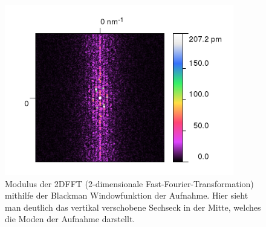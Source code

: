 \begin{figure}  
    \includegraphics[width=10cm]{pics/fourier3}
  \caption{Modulus der 2DFFT (2-dimensionale Fast-Fourier-Transformation) 
      mithilfe der Blackman Windowfunktion
  der Aufnahme. Hier sieht man deutlich das vertikal verschobene Sechseck in der Mitte,
  welches die Moden der Aufnahme darstellt.}
\label{fig:fourier3}
\end{figure}

